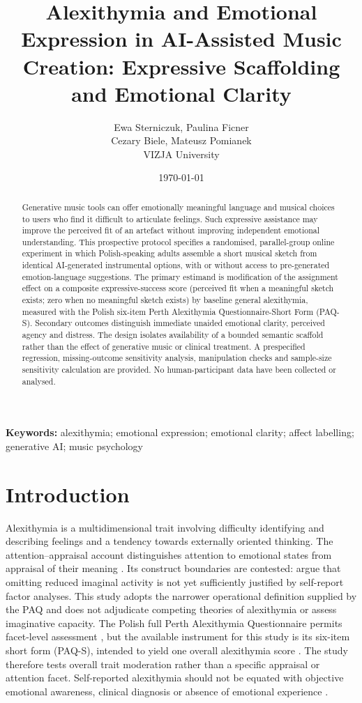\documentclass[11pt,a4paper]{article}
\title{Alexithymia and Emotional Expression in AI-Assisted Music Creation: Expressive Scaffolding and Emotional Clarity}
\author{Ewa Sterniczuk, Paulina Ficner\\Cezary Biele, Mateusz Pomianek\\[0.4em]\small VIZJA University}
\date{\today}
\begin{document}
\maketitle
\begin{abstract}
Generative music tools can offer emotionally meaningful language and musical choices to users who find it difficult to articulate feelings. Such expressive assistance may improve the perceived fit of an artefact without improving independent emotional understanding. This prospective protocol specifies a randomised, parallel-group online experiment in which Polish-speaking adults assemble a short musical sketch from identical AI-generated instrumental options, with or without access to pre-generated emotion-language suggestions. The primary estimand is modification of the assignment effect on a composite expressive-success score (perceived fit when a meaningful sketch exists; zero when no meaningful sketch exists) by baseline general alexithymia, measured with the Polish six-item Perth Alexithymia Questionnaire-Short Form (PAQ-S). Secondary outcomes distinguish immediate unaided emotional clarity, perceived agency and distress. The design isolates availability of a bounded semantic scaffold rather than the effect of generative music or clinical treatment. A prespecified regression, missing-outcome sensitivity analysis, manipulation checks and sample-size sensitivity calculation are provided. No human-participant data have been collected or analysed.
\end{abstract}
\noindent\textbf{Keywords:} alexithymia; emotional expression; emotional clarity; affect labelling; generative AI; music psychology

\section{Introduction}
Alexithymia is a multidimensional trait involving difficulty identifying and describing feelings and a tendency towards externally oriented thinking. The attention--appraisal account distinguishes attention to emotional states from appraisal of their meaning \parencite{preece2017,preece2018}. Its construct boundaries are contested: \textcite{taylor2024} argue that omitting reduced imaginal activity is not yet sufficiently justified by self-report factor analyses. This study adopts the narrower operational definition supplied by the PAQ and does not adjudicate competing theories of alexithymia or assess imaginative capacity. The Polish full Perth Alexithymia Questionnaire permits facet-level assessment \parencite{larionow2022,paqpl2022}, but the available instrument for this study is its six-item short form (PAQ-S), intended to yield one overall alexithymia score \parencite{preece2023,larionow2023}. The study therefore tests overall trait moderation rather than a specific appraisal or attention facet. Self-reported alexithymia should not be equated with objective emotional awareness, clinical diagnosis or absence of emotional experience \parencite{lane2021}.
\end{document}
